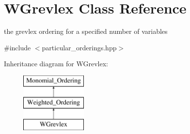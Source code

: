 \hypertarget{class_w_grevlex}{}\section{W\+Grevlex Class Reference}
\label{class_w_grevlex}


the grevlex ordering for a specified number of variables  




{\ttfamily \#include $<$particular\+\_\+orderings.\+hpp$>$}

Inheritance diagram for W\+Grevlex\+:\begin{figure}[H]
\begin{center}
\leavevmode
\includegraphics[height=3.000000cm]{class_w_grevlex}
\end{center}
\end{figure}
